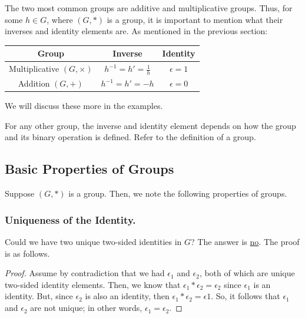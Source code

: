 \documentclass[letterpaper]{article}
\begin{document}
\begin{note*}{}{}
    The two most common groups are additive and multiplicative groups. Thus, for some $h \in G$, where $(G, *)$ is a group, it is important to mention what their inverses and identity elements are. As mentioned in the previous section:
    \begin{center}
        \begin{tabular}{|c|c|c|}
            \hline 
            \textbf{Group} & \textbf{Inverse} & \textbf{Identity} \\ 
            \hline 
            Multiplicative $(G, \times)$ & $h^{-1} = h' = \frac{1}{h}$ & $\epsilon = 1$ \\ 
            Addition $(G, +)$ & $h^{-1} = h' = -h$ & $\epsilon = 0$ \\ 
            \hline 
        \end{tabular}
    \end{center}
    We will discuss these more in the examples. 

    \bigskip 

    For any other group, the inverse and identity element depends on how the group and its binary operation is defined. Refer to the definition of a group.
\end{note*}

\subsection{Basic Properties of Groups}
Suppose $(G, *)$ is a group. Then, we note the following properties of groups. 

\subsubsection{Uniqueness of the Identity.} 
Could we have two unique two-sided identities in $G$? The answer is \underline{no}. The proof is as follows. 

\begin{mdframed}
    \begin{proof}
        Assume by contradiction that we had $\epsilon_1$ and $\epsilon_2$, both of which are unique two-sided identity elements. Then, we know that $\epsilon_1 * \epsilon_2 = \epsilon_2$ since $\epsilon_1$ is an identity. But, since $\epsilon_2$ is also an identity, then $\epsilon_1 * \epsilon_2 = \epsilon1$. So, it follows that $\epsilon_1$ and $\epsilon_2$ are not unique; in other words, $\epsilon_1 = \epsilon_2$. 
    \end{proof}
\end{mdframed}
\end{document}
